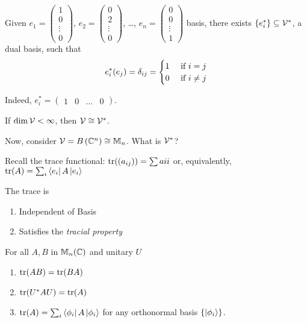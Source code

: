Given $e_1 = \begin{pmatrix}1\\0\\\vdots\\0\end{pmatrix}$, $e_2 = \begin{pmatrix}0\\2\\\vdots\\0\end{pmatrix}$, \dots, $e_n = \begin{pmatrix}0\\0\\\vdots\\1\end{pmatrix}$ basis, there exists $\left\lbrace e_i^*\right\rbrace \subseteq \mathcal{V}^*$,
a dual basis, such that \[e_i^*(e_j) = \delta_{ij} = \begin{cases}1 & \hbox{ if $i=j$}\\0 & \hbox{ if $i\neq j$}\end{cases}\]

Indeed, $e_i^* = \begin{pmatrix}1&0&\dots&0\end{pmatrix}$.
\begin{theorem}
    If $\dim\mathcal{V} < \infty$, then $\mathcal{V} \cong \mathcal{V}^*$.
\end{theorem}

Now, consider $\mathcal{V} = B\left(\mathbb{C}^n\right) \cong \mathbb{M}_n$.
What is $\mathcal{V}^*$?

Recall the trace functional: $\operatorname{tr}((a_{ij})) = \sum a{ii}$ or, equivalently,
$\operatorname{tr}(A) = \sum_i \left\langle e_i\right|A\left|e_i\right\rangle$

The trace is
\begin{enumerate}[label=\arabic*)]
    \item Independent of Basis
    \item Satisfies the \emph{tracial property}
\end{enumerate}

\begin{theorem}
    For all $A, B$ in $\mathbb{M}_n(\mathbb{C})$ and unitary $U$
    \begin{enumerate}[label=\arabic*)]
        \item $\operatorname{tr}(AB) = \operatorname{tr}(BA)$
        \item $\operatorname{tr}(U^*AU) = \operatorname{tr}(A)$
        \item $\operatorname{tr}(A) = \sum_i \left\langle \phi_i\right|A\left|\phi_i\right\rangle$ for any orthonormal basis $\left\lbrace\left|\phi_i\right\rangle\right\rbrace$.
    \end{enumerate}
\end{theorem}

